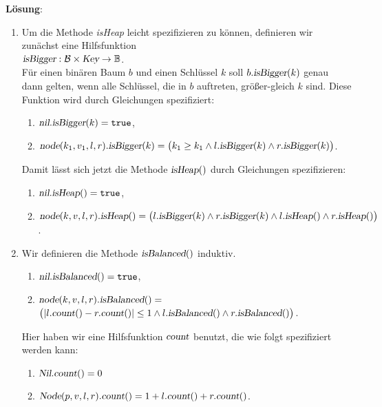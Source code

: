 \documentclass{article}
\begin{document}
\noindent
\textbf{L\"osung}:
\begin{enumerate}
\item Um die Methode \textsl{isHeap} leicht spezifizieren zu k\"onnen, definieren wir zun\"achst
      eine Hilfsfunktion
      \\[0.2cm]
      \hspace*{1.3cm}
      $\textsl{isBigger} : \mathcal{B}  \times \textsl{Key}  \rightarrow \mathbb{B}$.
      \\[0.2cm]
      F\"ur einen bin\"aren Baum $b$ und einen Schl\"ussel $k$ soll $b.\textsl{isBigger}(k)$ genau dann gelten,
      wenn alle Schl\"ussel, die in $b$ auftreten, gr\"o{\ss}er-gleich $k$ sind.
      Diese Funktion wird durch Gleichungen spezifiziert:
      \begin{enumerate}
      \item $\textsl{nil}.\textsl{isBigger}(k) = \mathtt{true}$,
      \item $\textsl{node}(k_1,v_1,l,r).\textsl{isBigger}(k) = \bigl(k_1 \geq k_1 \wedge l.\textsl{isBigger}(k) \wedge r.\textsl{isBigger}(k)\bigr)$.
      \end{enumerate}
      Damit l\"asst sich jetzt die Methode $\textsl{isHeap}()$ durch Gleichungen spezifizieren:
      \begin{enumerate}
      \item $\textsl{nil}.\textsl{isHeap}() = \mathtt{true}$,
      \item $\textsl{node}(k,v,l,r).\textsl{isHeap}() = 
             \bigl(l.\textsl{isBigger}(k) \wedge r.\textsl{isBigger}(k) \wedge l.\textsl{isHeap}() \wedge r.\textsl{isHeap}()\bigr)$.
      \end{enumerate}
\item Wir definieren die Methode $\textsl{isBalanced}()$ induktiv.
      \begin{enumerate}
      \item $\textsl{nil}.\textsl{isBalanced}() = \mathtt{true}$,
      \item $\textsl{node}(k,v,l,r).\textsl{isBalanced}() =$ \\[0.1cm]
            \hspace*{\fill}
            $\bigl(|l.\textsl{count}() - r.\textsl{count}()| \leq 1 
             \wedge l.\textsl{isBalanced}()\wedge r.\textsl{isBalanced}()\bigr)$.
      \end{enumerate}
      Hier haben wir eine Hilfsfunktion $\textsl{count}$ benutzt, die wie folgt spezifiziert werden kann:
      \begin{enumerate}
      \item $\textsl{Nil}.\textsl{count}() = 0$
      \item $\textsl{Node}(p,v,l,r).\textsl{count}() = 1 + l.\textsl{count}() + r.\textsl{count}()$.
      \end{enumerate}
\end{enumerate}
\pagebreak
\end{document}
